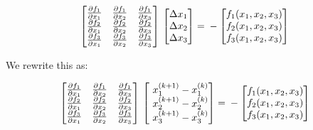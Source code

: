 \documentclass[12pt]{article}
\renewcommand{\_}{\kern-1.5pt\textunderscore\kern-1.5pt}
\begin{document}
$$ \begin{bmatrix}
\frac{\partial f_1}{\partial x_1}  & \frac{\partial f_1}{\partial x_2}  & \frac{\partial f_1}{\partial x_3} \\
\frac{\partial f_2}{\partial x_1}  & \frac{\partial f_2}{\partial x_2}  & \frac{\partial f_2}{\partial x_3} \\
\frac{\partial f_3}{\partial x_1}  & \frac{\partial f_3}{\partial x_2}  & \frac{\partial f_3}{\partial x_3} 
\end{bmatrix} \\ 
\begin{bmatrix}
\Delta x_1 \\
\Delta x_2 \\
\Delta x_3
\end{bmatrix} = \\
-\begin{bmatrix}
f_1 (x_1,x_2,x_3) \\
f_2 (x_1,x_2,x_3) \\
f_3 (x_1,x_2,x_3)
\end{bmatrix}
$$

We rewrite this as:

$$ \begin{bmatrix}
\frac{\partial f_1}{\partial x_1}  & \frac{\partial f_1}{\partial x_2}  & \frac{\partial f_1}{\partial x_3} \\
\frac{\partial f_2}{\partial x_1}  & \frac{\partial f_2}{\partial x_2}  & \frac{\partial f_2}{\partial x_3} \\
\frac{\partial f_3}{\partial x_1}  & \frac{\partial f_3}{\partial x_2}  & \frac{\partial f_3}{\partial x_3} 
\end{bmatrix} \\ 
\begin{bmatrix}
\ x_1^{(k+1)} - x_1^{(k)} \\
\ x_2^{(k+1)} - x_2^{(k)}\\
\ x_3^{(k+1)} - x_3^{(k)}
\end{bmatrix} = \\
-\begin{bmatrix}
f_1 (x_1,x_2,x_3) \\
f_2 (x_1,x_2,x_3) \\
f_3 (x_1,x_2,x_3)
\end{bmatrix}
$$
\end{document}
